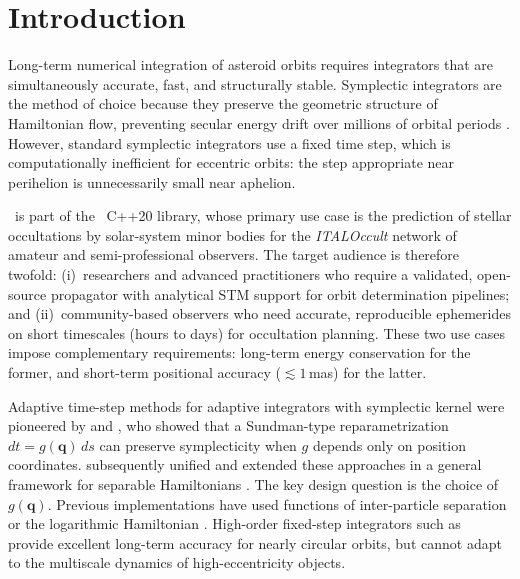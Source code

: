 
\section{Introduction}
\label{sec:intro}

Long-term numerical integration of asteroid orbits requires
integrators that are simultaneously accurate, fast, and structurally
stable. Symplectic integrators \citep{WisdomHolman1991, Yoshida1990}
are the method of choice because they preserve the geometric structure
of Hamiltonian flow, preventing secular energy drift over millions of
orbital periods \citep{HairerLubichWanner2006, Lu2024trace, Ye2025}. However, 
standard symplectic integrators use a fixed time step, which is computationally
inefficient for eccentric orbits: the step appropriate near perihelion
is unnecessarily small near aphelion.

\AAS\ is part of the \astdyn\ C++20 library, whose primary use
case is the prediction of stellar occultations by solar-system
minor bodies for the \textit{ITALOccult} network of amateur and
semi-professional observers.
The target audience is therefore twofold: (i)~researchers and
advanced practitioners who require a validated, open-source
propagator with analytical STM support for orbit determination
pipelines; and (ii)~community-based observers who need accurate,
reproducible ephemerides on short timescales (hours to days) for
occultation planning. These two use cases impose complementary
requirements: long-term energy conservation for the former,
and short-term positional accuracy ($\lesssim 1$\,mas) for
the latter.

Adaptive time-step methods for adaptive integrators with symplectic kernel were pioneered
by \citet{PretoTremaine1999} and \citet{MikkolaTanikawa1999}, who
showed that a Sundman-type reparametrization $dt = g(\mathbf{q})\,ds$
can preserve symplecticity when $g$ depends only on position
coordinates. \citet{BlanesIserles2012} subsequently unified and
extended these approaches in a general framework for separable
Hamiltonians \cite{Wang2024tts, Wu2024adaptive}.
The key design question is the choice of $g(\mathbf{q})$. Previous
implementations have used functions of inter-particle separation
\citep{PretoTremaine1999} or the logarithmic Hamiltonian
\citep{MikkolaTanikawa1999}. High-order fixed-step integrators
such as \saba\ \citep{LaskarRobutel2001} provide excellent long-term
accuracy for nearly circular orbits, but cannot adapt to the
multiscale dynamics of high-eccentricity objects.

